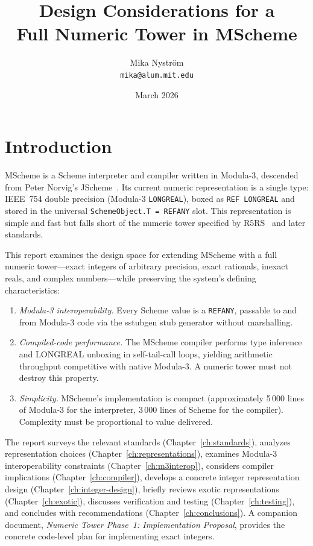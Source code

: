 \documentclass[12pt]{report}
\title{\bfseries\sffamily\fontsize{24.88}{30}\selectfont
  Design Considerations for a\\Full Numeric Tower in MScheme}
\author{Mika Nystr\"om \\ {\tt mika@alum.mit.edu}}
\date{March 2026}
\begin{document}
\maketitle
\thispagestyle{empty}

\newpage
\tableofcontents
\newpage

\chapter{Introduction}

MScheme is a Scheme interpreter and compiler written in Modula-3,
descended from Peter Norvig's JScheme~\cite{jscheme}.  Its current
numeric representation is a single type: IEEE~754 double precision
(Modula-3 {\tt LONGREAL}), boxed as {\tt REF LONGREAL} and stored
in the universal {\tt SchemeObject.T = REFANY} slot.  This
representation is simple and fast but falls short of
the numeric tower specified by R5RS~\cite{r5rs} and later standards.

This report examines the design space for extending MScheme with a
full numeric tower---exact integers of arbitrary precision, exact
rationals, inexact reals, and complex numbers---while preserving
the system's defining characteristics:

\begin{enumerate}
\item \emph{Modula-3 interoperability.}  Every Scheme value is a
  {\tt REFANY}, passable to and from Modula-3 code via the sstubgen
  stub generator without marshalling.

\item \emph{Compiled-code performance.}  The MScheme compiler
  performs type inference and LONGREAL unboxing in self-tail-call loops,
  yielding arithmetic throughput competitive with native Modula-3.
  A numeric tower must not destroy this property.

\item \emph{Simplicity.}  MScheme's implementation is compact
  (approximately 5\,000 lines of Modula-3 for the interpreter,
  3\,000 lines of Scheme for the compiler).  Complexity must be
  proportional to value delivered.
\end{enumerate}

The report surveys the relevant standards (Chapter~\ref{ch:standards}),
analyzes representation choices (Chapter~\ref{ch:representations}),
examines Modula-3 interoperability constraints
(Chapter~\ref{ch:m3interop}), considers compiler implications
(Chapter~\ref{ch:compiler}), develops a concrete integer
representation design (Chapter~\ref{ch:integer-design}), briefly
reviews exotic representations (Chapter~\ref{ch:exotic}), discusses
verification and testing (Chapter~\ref{ch:testing}), and concludes
with recommendations (Chapter~\ref{ch:conclusions}).
A companion document, \emph{Numeric Tower Phase~1: Implementation
Proposal}, provides the concrete code-level plan for implementing
exact integers.
\end{document}

